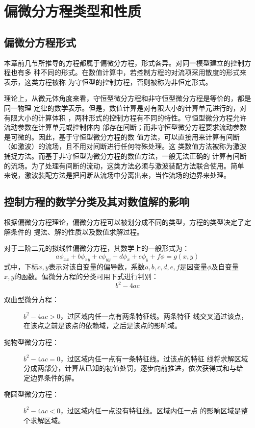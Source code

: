 \section{偏微分方程类型和性质}
\subsection{偏微分方程形式}
本章前几节所推导的方程都属于偏微分方程，形式各异。对同一模型建立的控制方程也有多
种不同的形式。在数值计算中，若控制方程的对流项采用散度的形式来表示，这类方程被称
为守恒型的控制方程，否则被称为非恒定形式。

理论上，从微元体角度来看，守恒型微分方程和非守恒型微分方程是等价的，都是同一物理
定律的数学表示。但是，数值计算是对有限大小的计算单元进行的，对有限大小的计算体积
，两种形式的控制方程有不同的特性。守恒型微分方程允许流动参数在计算单元或控制体内
部存在间断；而非守恒型微分方程要求流动参数是可微的。因此，基于守恒型微分方程的数
值方法，可以直接用来计算有间断（如激波）的流场，且不用对间断进行任何特殊处理。这
类数值方法被称为激波捕捉方法。而基于非守恒型为微分方程的数值方法，一般无法正确的
计算有间断的流场。为了处理有间断的流动，这类方法必须与激波装配方法联合使用。简单
来说，激波装配方法是把间断从流场中分离出来，当作流场的边界来处理。

\subsection{控制方程的数学分类及其对数值解的影响}
根据偏微分方程理论，偏微分方程可以被划分成不同的类型，方程的类型决定了定解条件的
提法、解的性质以及数值求解过程。

对于二阶二元的拟线性偏微分方程，其数学上的一般形式为：
\begin{equation}
  a\phi_{xx} + b\phi_{xy} + c\phi_{yy} + d\phi_{x} + e\phi_{y} + f\phi = g(x,y)
\end{equation}
式中，下标$x,y$表示对该自变量的偏导数，系数$a,b,c,d,e,f$是因变量$\phi$及自变量
$x,y$的函数。偏微分方程的分类可用下式进行判别：
\begin{equation}
  b^{2} - 4ac
\end{equation}
\begin{description}
  \item  [双曲型微分方程：] $b^{2}-4ac>0$，过区域内任一点有两条特征线。两条特征
    线交叉通过该点，在该点之前是该点的依赖域，之后是该点的影响域。
  \item [抛物型微分方程：] $b^{2}-4ac=0$，过区域内任一点有一条特征线。过该点的特征
    线将求解区域分成两部分，计算从已知的初值处罚，逐步向前推进，依次获得式和与给
    定边界条件的解。
  \item [椭圆型微分方程：] $b^{2}-4ac<0$，过区域内任一点没有特征线。区域内任一点
    的影响区域是整个求解区域。
\end{description}

